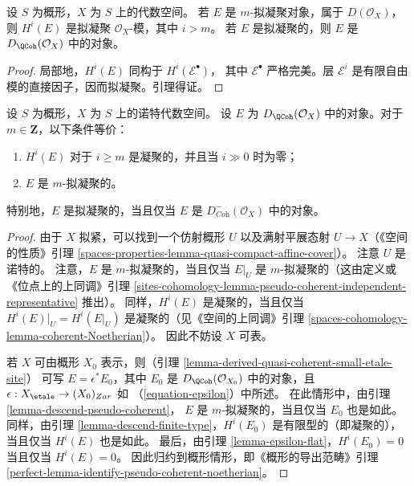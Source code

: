 \begin{lemma}
\label{lemma-pseudo-coherent}
设 $S$ 为概形，$X$ 为 $S$ 上的代数空间。
若 $E$ 是 $m$-拟凝聚对象，属于 $D(\mathcal{O}_X)$，
则 $H^i(E)$ 是拟凝聚 $\mathcal{O}_X$-模，其中 $i > m$。
若 $E$ 是拟凝聚的，则 $E$ 是
$D_\QCoh(\mathcal{O}_X)$ 中的对象。
\end{lemma}

\begin{proof}
局部地，$H^i(E)$ 同构于 $H^i(\mathcal{E}^\bullet)$，
其中 $\mathcal{E}^\bullet$ 严格完美。层 $\mathcal{E}^i$
是有限自由模的直接因子，因而拟凝聚。引理得证。
\end{proof}

\begin{lemma}
\label{lemma-identify-pseudo-coherent-noetherian}
设 $S$ 为概形，$X$ 为 $S$ 上的诺特代数空间。
设 $E$ 为 $D_\QCoh(\mathcal{O}_X)$ 中的对象。对于
$m \in \mathbf{Z}$，以下条件等价：
\begin{enumerate}
\item $H^i(E)$ 对于 $i \geq m$ 是凝聚的，并且当 $i \gg 0$ 时为零；
\item $E$ 是 $m$-拟凝聚的。
\end{enumerate}
特别地，$E$ 是拟凝聚的，当且仅当 $E$ 是
$D^-_{\textit{Coh}}(\mathcal{O}_X)$ 中的对象。
\end{lemma}

\begin{proof}
由于 $X$ 拟紧，可以找到一个仿射概形 $U$ 以及满射平展态射
$U \to X$（《空间的性质》引理
\ref{spaces-properties-lemma-quasi-compact-affine-cover}）。
注意 $U$ 是诺特的。
注意，$E$ 是 $m$-拟凝聚的，当且仅当 $E|_U$ 是
$m$-拟凝聚的（这由定义或《位点上的上同调》引理
\ref{sites-cohomology-lemma-pseudo-coherent-independent-representative} 推出）。
同样，$H^i(E)$ 是凝聚的，当且仅当
$H^i(E)|_U = H^i(E|_U)$ 是凝聚的（见《空间的上同调》引理
\ref{spaces-cohomology-lemma-coherent-Noetherian}）。
因此不妨设 $X$ 可表。

\medskip\noindent
若 $X$ 可由概形 $X_0$ 表示，则（引理
\ref{lemma-derived-quasi-coherent-small-etale-site}）
可写 $E = \epsilon^*E_0$，其中 $E_0$ 是
$D_\QCoh(\mathcal{O}_{X_0})$ 中的对象，且
$\epsilon : X_\etale \to (X_0)_{Zar}$ 如
（\ref{equation-epsilon}）中所述。
在此情形中，由引理 \ref{lemma-descend-pseudo-coherent}，
$E$ 是 $m$-拟凝聚的，当且仅当 $E_0$ 也是如此。
同样，由引理 \ref{lemma-descend-finite-type}，$H^i(E_0)$
是有限型的（即凝聚的），当且仅当 $H^i(E)$ 也是如此。
最后，由引理 \ref{lemma-epsilon-flat}，$H^i(E_0) = 0$
当且仅当 $H^i(E) = 0$。
因此归约到概形情形，即《概形的导出范畴》引理
\ref{perfect-lemma-identify-pseudo-coherent-noetherian}。
\end{proof}

